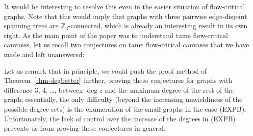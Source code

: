 \documentclass{article}
\begin{document}
\conjdensitycrit*

It would be interesting to resolve this even in the easier situation of
flow-critical graphs. Note that this would imply that graphs with three pairwise
edge-disjoint spanning trees are $\mathbb{Z}_{3}$-connected, which is already an
interesting result in its own right. As the main point of the paper was to
understand tame flow-critical canvases, let us recall two conjectures on
tame flow-critical canvases that we have made and left unanswered:  

\conjfewlarge*

\conjcensusplus*

Let us remark that in principle, we could push the proof method of Theorem~\ref{thm-degbetter}
further, proving these conjectures for graphs with difference $3$, $4$, \ldots, between $\deg z$
and the maximum degree of the rest of the graph; essentially, the only difficulty (beyond the
increasing unwieldiness of the possible degree sets) is the enumeration of the small graphs
in the case (EXPB).  Unfortunately, the lack of control over the increase of the degrees
in (EXPB) prevents us from proving these conjectures in general.



\end{document}
